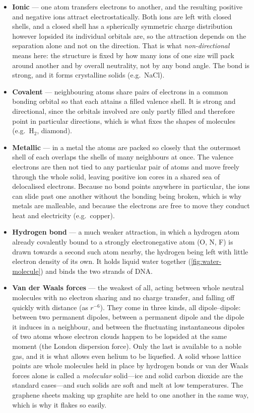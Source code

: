         \begin{itemize}
            \item \textbf{Ionic} --- one atom transfers electrons to another, and the resulting positive and negative ions attract electrostatically. Both ions are left with closed shells, and a closed shell has a spherically symmetric charge distribution however lopsided its individual orbitals are, so the attraction depends on the separation alone and not on the direction. That is what \emph{non-directional} means here: the structure is fixed by how many ions of one size will pack around another and by overall neutrality, not by any bond angle. The bond is strong, and it forms crystalline solids (e.g.\ NaCl).
            \item \textbf{Covalent} --- neighbouring atoms share pairs of electrons in a common bonding orbital so that each attains a filled valence shell. It is strong and directional, since the orbitals involved are only partly filled and therefore point in particular directions, which is what fixes the shapes of molecules (e.g.\ H$_2$, diamond).
            \item \textbf{Metallic} --- in a metal the atoms are packed so closely that the outermost shell of each overlaps the shells of many neighbours at once. The valence electrons are then not tied to any particular pair of atoms and move freely through the whole solid, leaving positive ion cores in a shared sea of delocalised electrons. Because no bond points anywhere in particular, the ions can slide past one another without the bonding being broken, which is why metals are malleable, and because the electrons are free to move they conduct heat and electricity (e.g.\ copper).
            \item \textbf{Hydrogen bond} --- a much weaker attraction, in which a hydrogen atom already covalently bound to a strongly electronegative atom (O, N, F) is drawn towards a second such atom nearby, the hydrogen being left with little electron density of its own. It holds liquid water together (\cref{fig:water-molecule}) and binds the two strands of DNA.
            \item \textbf{Van der Waals forces} --- the weakest of all, acting between whole neutral molecules with no electron sharing and no charge transfer, and falling off quickly with distance (as $r^{-6}$). They come in three kinds, all dipole--dipole: between two permanent dipoles, between a permanent dipole and the dipole it induces in a neighbour, and between the fluctuating instantaneous dipoles of two atoms whose electron clouds happen to be lopsided at the same moment (the London dispersion force). Only the last is available to a noble gas, and it is what allows even helium to be liquefied. A solid whose lattice points are whole molecules held in place by hydrogen bonds or van der Waals forces alone is called a \emph{molecular} solid---ice and solid carbon dioxide are the standard cases---and such solids are soft and melt at low temperatures. The graphene sheets making up graphite are held to one another in the same way, which is why it flakes so easily.
        \end{itemize}

